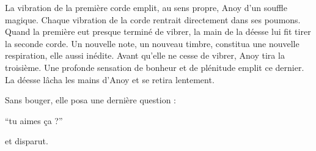 La vibration de la première corde emplit, au sens propre, Anoy d'un
souffle magique. Chaque vibration de la corde rentrait directement
dans ses poumons. Quand la première eut presque terminé de vibrer, la
main de la déesse lui fit tirer la seconde corde. Un nouvelle note, un
nouveau timbre, constitua une nouvelle respiration, elle aussi
inédite. Avant qu'elle ne cesse de vibrer, Anoy tira la troisième. Une
profonde sensation de bonheur et de plénitude emplit ce dernier. La
déesse lâcha les mains d'Anoy et se retira lentement.

Sans bouger, elle posa une dernière question : 

``tu aimes ça ?''

et disparut.

